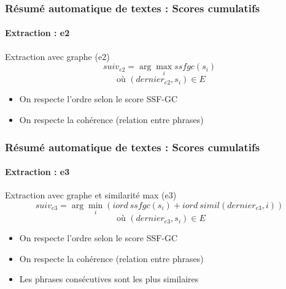 \documentclass[xcolor=table]{beamer}
\begin{document}
\begin{frame}
\frametitle{Résumé automatique de textes : Scores cumulatifs}
\framesubtitle{Extraction : e2}

\begin{block}{Extraction avec graphe (e2)}
	\[suiv_{e2}  =  \arg\max\limits_i ssfgc(s_i)\]
	\[\text{ où } (dernier_{e2}, s_i) \in E\]
\end{block}
\begin{itemize}
	\item On respecte l'ordre selon le score SSF-GC
	\item On respecte la cohérence (relation entre phrases)
\end{itemize}
%		
%		
	
\end{frame}

\begin{frame}
\frametitle{Résumé automatique de textes : Scores cumulatifs}
\framesubtitle{Extraction : e3}

\begin{block}{Extraction avec graphe et similarité max (e3)}
	\[suiv_{e3}  =  \arg\min\limits_i (iord\ ssfgc(s_i) + iord\ simil(dernier_{e3}, i))\]
	\[\text{ où } (dernier_{e3}, s_i) \in E\]
\end{block}
\begin{itemize}
	\item On respecte l'ordre selon le score SSF-GC
	\item On respecte la cohérence (relation entre phrases)
	\item Les phrases consécutives sont les plus similaires
\end{itemize}
%		
%		
	
\end{frame}
\end{document}
